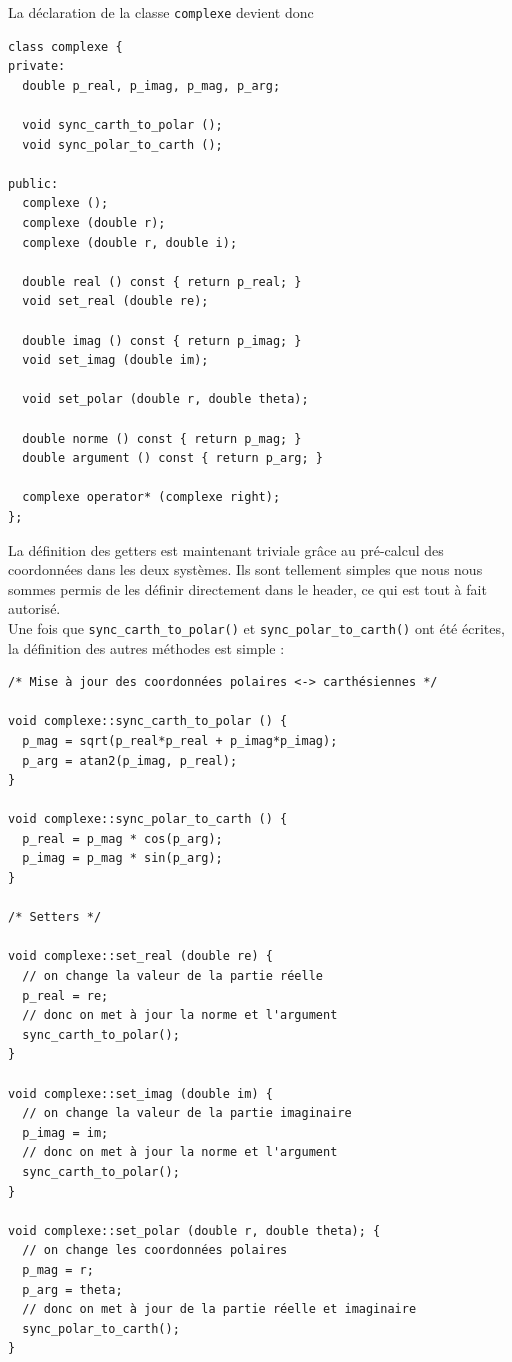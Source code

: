 \documentclass{book}
\newcommand{\inline}[1]{\texttt{#1}}
\begin{document}
\begin{correction}
La déclaration de la classe \inline{complexe} devient donc
\begin{verbatim}
class complexe {
private:
  double p_real, p_imag, p_mag, p_arg;

  void sync_carth_to_polar ();
  void sync_polar_to_carth ();

public:
  complexe ();
  complexe (double r);
  complexe (double r, double i);

  double real () const { return p_real; }
  void set_real (double re);

  double imag () const { return p_imag; }
  void set_imag (double im);

  void set_polar (double r, double theta);

  double norme () const { return p_mag; }
  double argument () const { return p_arg; }

  complexe operator* (complexe right);
};
\end{verbatim}

La définition des getters est maintenant triviale grâce au pré-calcul des coordonnées dans les deux systèmes. Ils sont tellement simples que nous nous sommes permis de les définir directement dans le header, ce qui est tout à fait autorisé.\\

Une fois que \inline{sync_carth_to_polar()} et \inline{sync_polar_to_carth()} ont été écrites, la définition des autres méthodes est simple :

\begin{verbatim}
/* Mise à jour des coordonnées polaires <-> carthésiennes */

void complexe::sync_carth_to_polar () {
  p_mag = sqrt(p_real*p_real + p_imag*p_imag);
  p_arg = atan2(p_imag, p_real);
}

void complexe::sync_polar_to_carth () {
  p_real = p_mag * cos(p_arg);
  p_imag = p_mag * sin(p_arg);
}

/* Setters */

void complexe::set_real (double re) {
  // on change la valeur de la partie réelle
  p_real = re;
  // donc on met à jour la norme et l'argument
  sync_carth_to_polar();
}

void complexe::set_imag (double im) {
  // on change la valeur de la partie imaginaire
  p_imag = im;
  // donc on met à jour la norme et l'argument
  sync_carth_to_polar();
}

void complexe::set_polar (double r, double theta); {
  // on change les coordonnées polaires
  p_mag = r;
  p_arg = theta;
  // donc on met à jour de la partie réelle et imaginaire
  sync_polar_to_carth();
}
\end{verbatim}


\end{correction}
\end{document}
